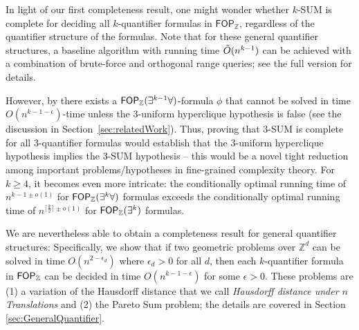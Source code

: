 In light of our first completeness result, one might wonder whether $k$-SUM is complete for deciding all $k$-quantifier formulas in $\mathsf{FOP}_{\mathbb{Z}}$,
regardless of the quantifier structure of the formulas.
Note that for these general quantifier structures, a baseline algorithm with running time $\Tilde{O}(n^{k-1})$ can be achieved with a combination of brute-force and orthogonal range queries; see the full version for details. 

However, by \cite[Theorem 15]{DBLP:journals/algorithmica/AnGIJKN22} there exists a $\mathsf{FOP}_{\mathbb{Z}}(\exists^{k-1} \forall)$-formula $\phi$ that cannot be solved in time $O(n^{k-1-\epsilon})$-time unless the 3-uniform hyperclique hypothesis is false (see the discussion in Section~\ref{sec:relatedWork}). Thus, proving that 3-SUM is complete for all 3-quantifier formulas would establish that the 3-uniform hyperclique hypothesis implies the $3$-SUM hypothesis -- this would be a novel tight reduction among important problems/hypotheses in fine-grained complexity theory. For $k\ge 4$, it becomes even more intricate: the conditionally optimal running time of $n^{k-1\pm o(1)}$ for $\mathsf{FOP}_{\mathbb{Z}}(\exists^k \forall)$ formulas exceeds the conditionally optimal running time of $n^{\lceil \frac{k}{2} \rceil \pm o(1)}$ for $\mathsf{FOP}_{\mathbb{Z}}(\exists^k)$ formulas.  

We are nevertheless able to obtain a completeness result for general quantifier structures: Specifically, we show that if two geometric problems over $\mathbb{Z}^d$ can be solved in time $O(n^{2-\epsilon_d})$ where $\epsilon_d > 0$ for all $d$, then each $k$-quantifier formula in $\mathsf{FOP}_{\mathbb{Z}}$ can be decided in time $O(n^{k-1-\epsilon})$ for some $\epsilon > 0$. These problems are (1) a variation of the Hausdorff distance that we call \emph{Hausdorff distance under $n$ Translations} and (2) the Pareto Sum problem; the details are covered in Section \ref{sec:GeneralQuantifier}.

